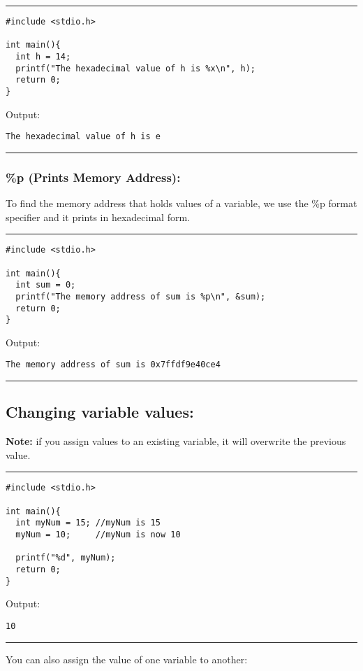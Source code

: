 \documentclass[a4paper]{article}
\begin{document}
\noindent\rule{\textwidth}{0.5pt}
\begin{verbatim}
#include <stdio.h>

int main(){
  int h = 14;
  printf("The hexadecimal value of h is %x\n", h);
  return 0;
}
\end{verbatim}
Output:
\begin{verbatim}
The hexadecimal value of h is e
\end{verbatim}

\noindent\rule{\textwidth}{0.5pt}

\subsubsection{\%p (Prints Memory Address):}
\label{sec:org76d46d1}
To find the memory address that holds values of a variable, we use the \%p format
specifier and it prints in hexadecimal form.

\noindent\rule{\textwidth}{0.5pt}
\begin{verbatim}
#include <stdio.h>

int main(){
  int sum = 0;
  printf("The memory address of sum is %p\n", &sum);
  return 0;
}
\end{verbatim}
Output:
\begin{verbatim}
The memory address of sum is 0x7ffdf9e40ce4
\end{verbatim}

\noindent\rule{\textwidth}{0.5pt}

\subsection{Changing variable values:}
\label{sec:org9b327b2}
\textbf{Note:} if you assign values to an existing variable, it will overwrite the
 previous value.

\noindent\rule{\textwidth}{0.5pt}
\begin{verbatim}
#include <stdio.h>

int main(){
  int myNum = 15; //myNum is 15
  myNum = 10;     //myNum is now 10

  printf("%d", myNum);
  return 0;
}
\end{verbatim}
Output:
\begin{verbatim}
10
\end{verbatim}

\noindent\rule{\textwidth}{0.5pt}

You can also assign the value of one variable to another:
\end{document}
